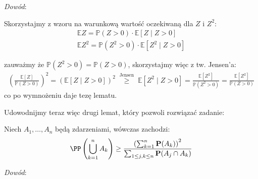 \documentclass[11pt]{scrartcl}
\begin{document}
    \textit{Dowód}:

    Skorzystajmy z wzoru na warunkową wartość oczekiwaną dla $Z$ i $Z^2$:
    \begin{gather*}
        \mathbb{E} Z = \mathbb{P} (Z > 0) \cdot \mathbb{E} \left [ Z \mid Z > 0 \right ] \\
        \mathbb{E} Z^2 = \mathbb{P} (Z^2 > 0) \cdot \mathbb{E} \left [ Z^2 \mid Z > 0 \right ] 
    \end{gather*}

    zauważmy że $ \mathbb{P} (Z^2 > 0) = \mathbb{P} (Z > 0) $, skorzystajmy więc z tw. Jensen'a:
    \begin{gather*}
        \left ( \frac{\mathbb{E} [Z]}{\mathbb{P} (Z > 0)} \right )^2 = 
        \left ( \mathbb{E} \left [ Z \mid Z > 0 \right ] \right )^2 
        \; \stackrel{\text{Jensen}}{\geq} \;
        \mathbb{E} \left [ Z^2 \mid Z > 0 \right ] =
        \frac{\mathbb{E} [Z^2]}{\mathbb{P} (Z^2 > 0)} =
        \frac{\mathbb{E} [Z^2]}{\mathbb{P} (Z > 0)}
    \end{gather*}
    co po wymnożeniu daje tezę lematu.

    Udowodnijmy teraz więc drugi lemat, który pozwoli rozwiązać zadanie:
    \begin{lemat}
        \label{lem:nier}
        Niech $A_1, \dots, A_n$ będą zdarzeniami, wówczas zachodzi:
        \[
            \PP \left ( \bigcup_{k = 1}^n A_k \right ) \geq 
                \frac{\left( \sum_{k=1}^{n} \mathbf{P}(A_k) \right)^2}
                {\sum_{1 \leq j, k \leq n} \mathbf{P}(A_j \cap A_k)} 
        \]
    \end{lemat}
    
    \textit{Dowód}:
\end{document}
